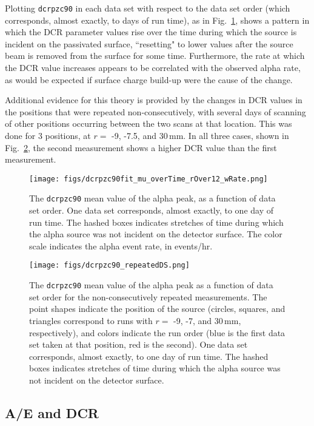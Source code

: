 \documentclass[groupedaddress,rmp,amsmath,amssymb,bibnotes,altaffilletter,twocolumn]{revtex4-1}
\begin{document}
Plotting {\tt dcrpzc90} in each data set with respect to the data set order (which corresponds, almost exactly, to days of run time), as in Fig.~\ref{fig:DCRvT}, shows a pattern in which the DCR parameter values rise over the time during which the source is incident on the passivated surface, ``resetting" to lower values after the source beam is removed from the surface for some time. Furthermore, the rate at which the DCR value increases appears to be correlated with the observed alpha rate, as would be expected if surface charge build-up were the cause of the change. 

Additional evidence for this theory is provided by the changes in DCR values in the positions that were repeated non-consecutively, with several days of scanning of other positions occurring between the two scans at that location. This was done for 3 positions, at $r= $  -9, -7.5, and 30\,mm. In all three cases, shown in Fig.~\ref{fig:DCR_repeated}, the second measurement shows a higher DCR value than the first measurement.  

\begin{figure}[]
 \centering
 \texttt{[image: figs/dcrpzc90fit\_mu\_overTime\_rOver12\_wRate.png]}
 \caption{The {\tt dcrpzc90} mean value of the alpha peak, as a function of data set order. One data set corresponds, almost exactly, to one day of run time. The hashed boxes indicates stretches of time during which the alpha source was not incident on the detector surface. The color scale indicates the alpha event rate, in events/hr.} 
 \label{fig:DCRvT}
\end{figure}

\begin{figure}[]
 \centering
 \texttt{[image: figs/dcrpzc90\_repeatedDS.png]}
 \caption{The {\tt dcrpzc90} mean value of the alpha peak as a function of data set order for the non-consecutively repeated measurements. The point shapes indicate the position of the source (circles, squares, and triangles correspond to runs with $r=$ -9, -7, and 30\,mm, respectively), and colors indicate the run order (blue is the first data set taken at that position, red is the second). One data set corresponds, almost exactly, to one day of run time. The hashed boxes indicates stretches of time during which the alpha source was not incident on the detector surface.} 
 \label{fig:DCR_repeated}
\end{figure}



\subsection{A/E and DCR} 
\end{document}
